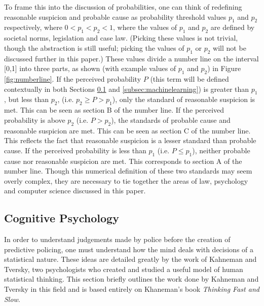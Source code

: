 \documentclass[12pt]{article} %
\begin{document}
To frame this into the discussion of probabilities, one can think of redefining reasonable suspicion and probable cause as probability threshold values $p_1$ and $p_2$ respectively, where $0 < p_1 < p_2 < 1$, where the values of $p_1$ and $p_2$ are defined by societal norms, legislation and case law. (Picking these values is not trivial, though the abstraction is still useful; picking the values of $p_1$ or $p_2$ will not be discussed further in this paper.) These values divide a number line on the interval [0,1] into three parts, as shown (with example values of $p_1$ and $p_2$) in Figure \ref{fig:numberline}. If the perceived probability $P$ (this term will be defined contextually in both Sections \ref{subsec:cognitive} and \ref{subsec:machinelearning}) is greater than $p_1$, but less than $p_2$, (i.e. $p_2 \geq P > p_1$), only the standard of reasonable suspicion is met. This can be seen as section B of the number line. If the perceived probability is above $p_2$ (i.e. $P > p_2$), the standards of probable cause and reasonable suspicion are met. This can be seen as section C of the number line. This reflects the fact that reasonable suspicion is a lesser standard than probable cause. If the perceived probability is less than $p_1$ (i.e. $P \leq p_1$), neither probable cause nor reasonable suspicion are met. This corresponds to section A of the number line. Though this numerical definition of these two standards may seem overly complex, they are necessary to tie together the areas of law, psychology and computer science discussed in this paper.

\subsection{Cognitive Psychology} \label{subsec:cognitive}
In order to understand judgements made by police before the creation of predictive policing, one must understand how the mind deals with decisions of a statistical nature. These ideas are detailed greatly by the work of Kahneman and Tversky, two psychologists who created and studied a useful model of human statistical thinking. This section briefly outlines the work done by Kahneman and Tversky in this field and is based entirely on Khaneman's book \textit{Thinking Fast and Slow}.\cite{kahneman}
\end{document}
